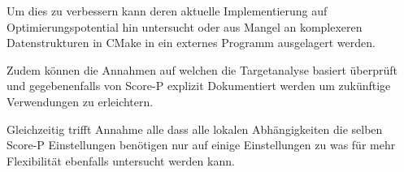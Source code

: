 \documentclass[german,proseminar,hyperref,utf8]{zihpub}
\begin{document}
    Um dies zu verbessern kann deren aktuelle Implementierung auf Optimierungspotential hin untersucht
    oder aus Mangel an komplexeren Datenstrukturen in CMake in ein externes Programm ausgelagert werden.

    Zudem können die Annahmen auf welchen die Targetanalyse basiert überprüft und gegebenenfalls von
    Score-P explizit Dokumentiert werden um zukünftige Verwendungen zu erleichtern.
    
    Gleichzeitig trifft Annahme alle dass alle lokalen Abhängigkeiten die selben Score-P Einstellungen
    benötigen nur auf einige Einstellungen zu was für mehr Flexibilität ebenfalls untersucht werden kann.

    \newpage
    \listoffigures
\end{document}
